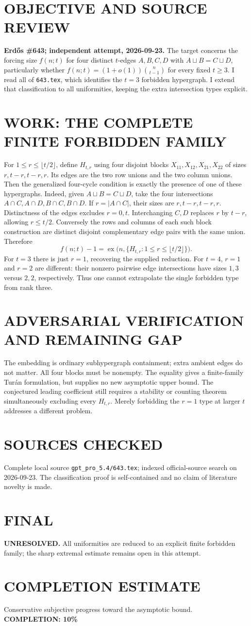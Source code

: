 \section{OBJECTIVE AND SOURCE REVIEW}
\textbf{Erd\H{o}s \#643; independent attempt, 2026-09-23.}
The target concerns the forcing size $f(n;t)$ for four distinct $t$-edges $A,B,C,D$ with $A\sqcup B=C\sqcup D$, particularly whether $f(n;t)=(1+o(1))\binom n{t-1}$ for every fixed $t\ge3$. I read all of \texttt{643.tex}, which identifies the $t=3$ forbidden hypergraph. I extend that classification to all uniformities, keeping the extra intersection types explicit.
\section{WORK: THE COMPLETE FINITE FORBIDDEN FAMILY}
For $1\le r\le\lfloor t/2\rfloor$, define $H_{t,r}$ using four disjoint blocks $X_{11},X_{12},X_{21},X_{22}$ of sizes $r,t-r,t-r,r$. Its edges are the two row unions and the two column unions. Then the generalized four-cycle condition is exactly the presence of one of these hypergraphs.
Indeed, given $A\sqcup B=C\sqcup D$, take the four intersections $A\cap C,A\cap D,B\cap C,B\cap D$. If $r=|A\cap C|$, their sizes are $r,t-r,t-r,r$. Distinctness of the edges excludes $r=0,t$. Interchanging $C,D$ replaces $r$ by $t-r$, allowing $r\le t/2$. Conversely the rows and columns of each such block construction are distinct disjoint complementary edge pairs with the same union. Therefore
\[
f(n;t)-1=\operatorname{ex}\bigl(n,\{H_{t,r}:1\le r\le\lfloor t/2\rfloor\}\bigr).
\]
For $t=3$ there is just $r=1$, recovering the supplied reduction. For $t=4$, $r=1$ and $r=2$ are different: their nonzero pairwise edge intersections have sizes $1,3$ versus $2,2$, respectively. Thus one cannot extrapolate the single forbidden type from rank three.
\section{ADVERSARIAL VERIFICATION AND REMAINING GAP}
The embedding is ordinary subhypergraph containment; extra ambient edges do not matter. All four blocks must be nonempty. The equality gives a finite-family Tur\'an formulation, but supplies no new asymptotic upper bound. The conjectured leading coefficient still requires a stability or counting theorem simultaneously excluding every $H_{t,r}$. Merely forbidding the $r=1$ type at larger $t$ addresses a different problem.
\section{SOURCES CHECKED}
Complete local source \texttt{gpt\_pro\_5.4/643.tex}; indexed official-source search on 2026-09-23. The classification proof is self-contained and no claim of literature novelty is made.
\section{FINAL}
\textbf{UNRESOLVED.} All uniformities are reduced to an explicit finite forbidden family; the sharp extremal estimate remains open in this attempt.
\section{COMPLETION ESTIMATE}
Conservative subjective progress toward the asymptotic bound.
\textbf{COMPLETION: 10\%}

